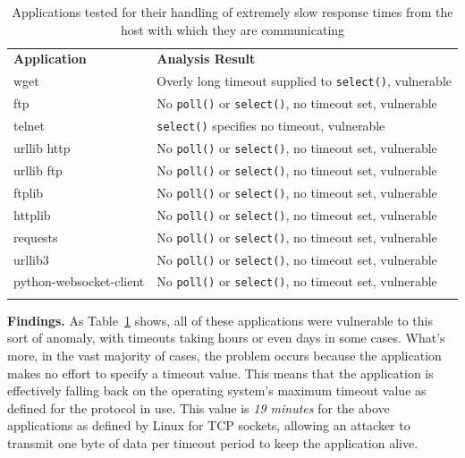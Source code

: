 \begin{table}[t]
  \scriptsize{}
  \begin{tabular}{l | l}
    \toprule{}
	  {\bf Application}              & {\bf Analysis Result}\\
    wget                     & Overly long timeout supplied to {\tt select()}, vulnerable\\
    ftp                      & No {\tt poll()} or {\tt select()}, no timeout set, vulnerable\\
    telnet                   & {\tt select()} specifies no timeout, vulnerable\\
    urllib http              & No {\tt poll()} or {\tt select()}, no timeout set, vulnerable\\
    urllib ftp               & No {\tt poll()} or {\tt select()}, no timeout set, vulnerable\\
    ftplib                   & No {\tt poll()} or {\tt select()}, no timeout set, vulnerable\\
    httplib                  & No {\tt poll()} or {\tt select()}, no timeout set, vulnerable\\
    requests                 & No {\tt poll()} or {\tt select()}, no timeout set, vulnerable\\
    urllib3                  & No {\tt poll()} or {\tt select()}, no timeout set, vulnerable\\
    python-websocket-client  & No {\tt poll()} or {\tt select()}, no timeout set, vulnerable\\
    \bottomrule{}
  \end{tabular}
  \caption{Applications tested for their handling of extremely slow response
    times from the host with which they are communicating }
  \label{table:slowloris}
\end{table}


{\bf Findings.}
 As Table~\ref{table:slowloris} shows, all of these
applications  were vulnerable to this sort of anomaly, with timeouts taking hours or
even days in some cases.
What's more, in the vast
majority of cases, the problem occurs because the application makes no effort to specify a
timeout value.  This means that the application is effectively falling back on
the operating system's maximum timeout value as defined for the protocol in
use.  This value is \emph{19 minutes} for the above applications as defined by
Linux for TCP sockets, allowing an
attacker to transmit one byte of data per timeout period to keep the
application alive.

